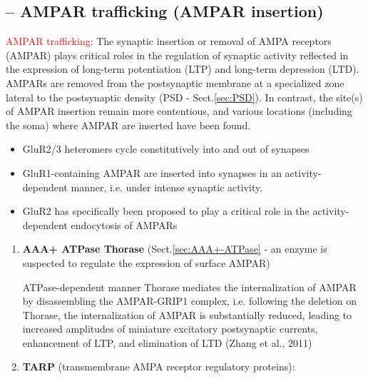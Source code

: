 \subsection{-- AMPAR trafficking (AMPAR insertion)}
\label{sec:AMPAR-insertion}

\textcolor{red}{AMPAR trafficking}: The synaptic insertion or removal of AMPA
receptors (AMPAR) plays critical roles in the regulation of synaptic activity
reflected in the expression of long-term potentiation (LTP) and long-term
depression (LTD). AMPARs are removed from the postsynaptic membrane at a
specialized zone lateral to the postsynaptic density (PSD - Sect.\ref{sec:PSD}).
In contrast, the site(s) of AMPAR insertion remain more contentious, and various
locations (including the soma) where AMPAR are inserted have been found.

\begin{itemize}
 
  \item  GluR2/3 heteromers cycle constitutively into and out of synapses
  
  \item GluR1-containing AMPAR are inserted into synapses in an
  activity-dependent manner, i.e. under intense synaptic activity.
  
  \item GluR2 has specifically been proposed to play a critical role in the
  activity-dependent endocytosis of AMPARs
\end{itemize}

\begin{enumerate}
  \item {\bf AAA+ ATPase Thorase} (Sect.\ref{sec:AAA+-ATPase} - an enzyme is
  suspected to regulate the expression of surface AMPAR)
  
ATPase-dependent manner Thorase mediates the internalization of AMPAR by
disassembling the AMPAR-GRIP1 complex, i.e. following the deletion on Thorase,
the internalization of AMPAR is substantially reduced, leading to increased
amplitudes of miniature excitatory postsynaptic currents, enhancement of LTP,
and elimination of LTD (Zhang et al., 2011) \citep{zhang2011}

\label{sec:TARP}
  \item {\bf TARP} (transmembrane AMPA receptor regulatory proteins): 
  
  
\end{enumerate}

